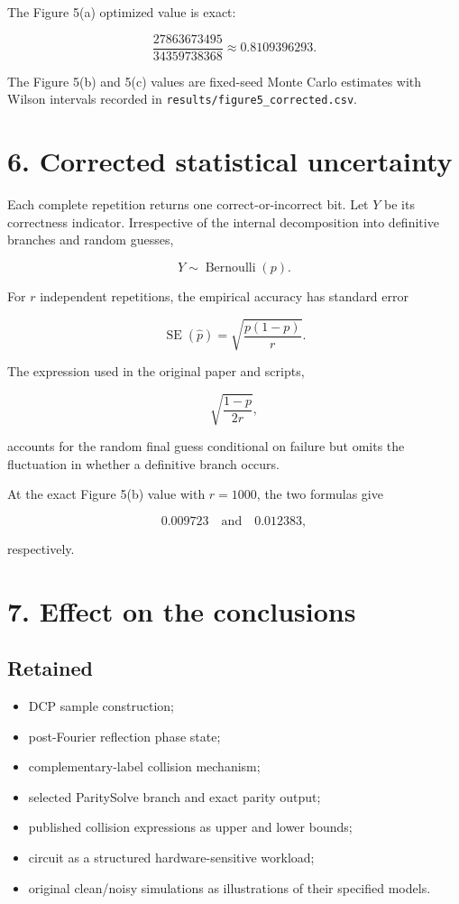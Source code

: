 \documentclass[
  10pt,
]{article}
\providecommand{\tightlist}{%
  \setlength{\itemsep}{0pt}\setlength{\parskip}{0pt}}
\begin{document}
The Figure 5(a) optimized value is exact:

\[
\frac{27863673495}{34359738368}
\approx0.8109396293.
\]

The Figure 5(b) and 5(c) values are fixed-seed Monte Carlo estimates
with Wilson intervals recorded in
\texttt{results/figure5\_corrected.csv}.

\section{6. Corrected statistical
uncertainty}\label{corrected-statistical-uncertainty}

Each complete repetition returns one correct-or-incorrect bit. Let \(Y\)
be its correctness indicator. Irrespective of the internal decomposition
into definitive branches and random guesses,

\[
Y\sim\operatorname{Bernoulli}(p).
\]

For \(r\) independent repetitions, the empirical accuracy has standard
error

\[
\boxed{
\operatorname{SE}(\widehat p)
=
\sqrt{\frac{p(1-p)}r}
}.
\]

The expression used in the original paper and scripts,

\[
\sqrt{\frac{1-p}{2r}},
\]

accounts for the random final guess conditional on failure but omits the
fluctuation in whether a definitive branch occurs.

At the exact Figure 5(b) value with \(r=1000\), the two formulas give

\[
0.009723
\quad\text{and}\quad
0.012383,
\]

respectively.

\section{7. Effect on the conclusions}\label{effect-on-the-conclusions}

\subsection{Retained}\label{retained}

\begin{itemize}
\tightlist
\item
  DCP sample construction;
\item
  post-Fourier reflection phase state;
\item
  complementary-label collision mechanism;
\item
  selected ParitySolve branch and exact parity output;
\item
  published collision expressions as upper and lower bounds;
\item
  circuit as a structured hardware-sensitive workload;
\item
  original clean/noisy simulations as illustrations of their specified
  models.
\end{itemize}
\end{document}
